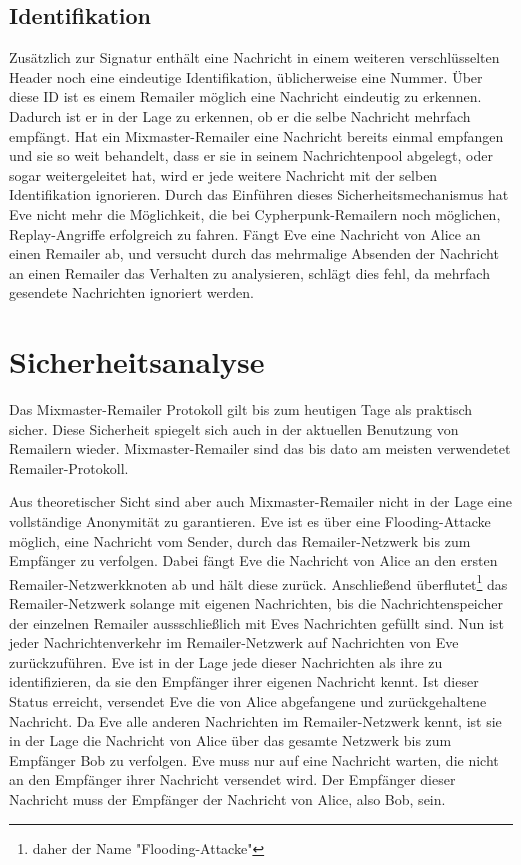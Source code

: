 \subsection{Identifikation}
Zusätzlich zur Signatur enthält eine Nachricht in einem weiteren verschlüsselten Header noch eine eindeutige Identifikation, üblicherweise eine Nummer. Über diese ID ist es einem Remailer möglich eine Nachricht eindeutig zu erkennen. Dadurch ist er in der Lage zu erkennen, ob er die selbe Nachricht mehrfach empfängt. Hat ein Mixmaster-Remailer eine Nachricht bereits einmal empfangen und sie so weit behandelt, dass er sie in seinem Nachrichtenpool abgelegt, oder sogar weitergeleitet hat, wird er jede weitere Nachricht mit der selben Identifikation ignorieren. Durch das Einführen dieses Sicherheitsmechanismus hat Eve nicht mehr die Möglichkeit, die bei Cypherpunk-Remailern noch möglichen, Replay-Angriffe erfolgreich zu fahren. Fängt Eve eine Nachricht von Alice an einen Remailer ab, und versucht durch das mehrmalige Absenden der Nachricht an einen Remailer das Verhalten zu analysieren, schlägt dies fehl, da mehrfach gesendete Nachrichten ignoriert werden.

\section{Sicherheitsanalyse}
Das Mixmaster-Remailer Protokoll gilt bis zum heutigen Tage als praktisch sicher. Diese Sicherheit spiegelt sich auch in der aktuellen Benutzung von Remailern wieder. Mixmaster-Remailer sind das bis dato am meisten verwendetet Remailer-Protokoll.

Aus theoretischer Sicht sind aber auch Mixmaster-Remailer nicht in der Lage eine vollständige Anonymität zu garantieren. Eve ist es über eine Flooding-Attacke möglich, eine Nachricht vom Sender, durch das Remailer-Netzwerk bis zum Empfänger zu verfolgen. Dabei fängt Eve die Nachricht von Alice an den ersten Remailer-Netzwerkknoten ab und hält diese zurück. Anschließend überflutet\footnote{daher der Name "Flooding-Attacke"} das Remailer-Netzwerk solange mit eigenen Nachrichten, bis die Nachrichtenspeicher der einzelnen Remailer aussschließlich mit Eves Nachrichten gefüllt sind. Nun ist jeder Nachrichtenverkehr im Remailer-Netzwerk auf Nachrichten von Eve zurückzuführen. Eve ist in der Lage jede dieser Nachrichten als ihre zu identifizieren, da sie den Empfänger ihrer eigenen Nachricht kennt. Ist dieser Status erreicht, versendet Eve die von Alice abgefangene und zurückgehaltene Nachricht. Da Eve alle anderen Nachrichten im Remailer-Netzwerk kennt, ist sie in der Lage die Nachricht von Alice über das gesamte Netzwerk bis zum Empfänger Bob zu verfolgen. Eve muss nur auf eine Nachricht warten, die nicht an den Empfänger ihrer Nachricht versendet wird. Der Empfänger dieser Nachricht muss der Empfänger der Nachricht von Alice, also Bob, sein.

